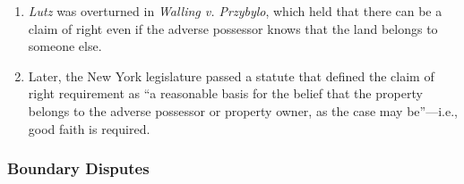 \begin{enumerate}
\begin{enumerate}
        \item \textbf{Good faith standard} (``I thought I owned it''): courts 
        often grant title to good faith trespassers but not to trespassers who 
        know the land does not belong to them.\footnote{Casebook pp. 132--133.}
        \item \textbf{Aggressive trespass standard} (``I knew I didn't own it, 
        but I intended to make it mine''): to qualify as adverse possessors, 
        occupants must intend to take the property for themselves. Courts 
        sometimes require the occupant to compensate the owner for the fair 
        market value of the property.
    \end{enumerate}
    \item \emph{Lutz} was overturned in \emph{Walling v. Przybylo}, which 
    held that there can be a claim of right even if the adverse possessor 
    knows that the land belongs to someone else.
    \item Later, the New York legislature passed a statute that defined the 
    claim of right requirement as ``a reasonable basis for the belief that the 
    property belongs to the adverse possessor or property owner, as the case 
    may be''---i.e., good faith is required.
\end{enumerate}

\subsubsection{Boundary Disputes}

